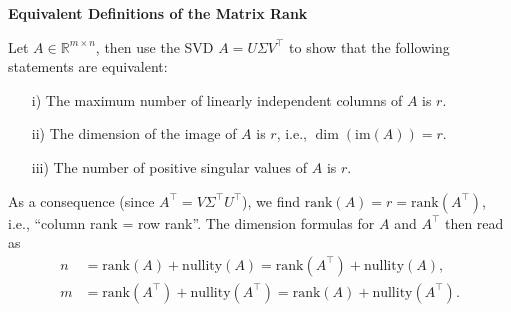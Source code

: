 \textbf{\normalsize Equivalent Definitions of the Matrix Rank}

Let $A \in \mathbb{R}^{m \times n}$, then use the SVD $A=U\Sigma V^\top$ to show that the following statements are equivalent:
\begin{itemize}
	\item[i)] The maximum number of linearly independent columns of $A$ is $r$.
	\item[ii)] The dimension of the image of $A$ is $r$, i.e., $\dim(\text{im}(A)) = r$.
	\item[iii)] The number of positive singular values of $A$ is $r$.
\end{itemize}
{\color{navy}As a consequence (since $A^\top = V\Sigma^\top U^\top$), we find 
$\text{rank}(A) = r=\text{rank}(A^\top)$, i.e., ``column rank = row rank''. The dimension formulas for $A$ and $A^\top$ then read as
\begin{align*}
n &= \text{rank}(A) + \text{nullity}(A)= \text{rank}(A^\top) + \text{nullity}(A),\\
m &= \text{rank}(A^\top) + \text{nullity}(A^\top)=\text{rank}(A) + \text{nullity}(A^\top).\\
\end{align*}
}